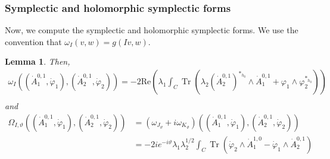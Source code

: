 \documentclass[12pt,letterpaper,reqno]{amsart}
\newtheorem{lem}[thm]{Lemma}
\theoremstyle{remark}
\theoremstyle{definition}
\numberwithin{thm}{section}
\numberwithin{equation}{section}
\numberwithin{figure}{section}
\DeclareMathOperator{\Tr}{Tr}
\begin{document}
\subsubsection{Symplectic and holomorphic symplectic forms}
Now, we compute the symplectic and holomorphic symplectic forms. We use the convention that $\omega_{I}(v,w) = g(Iv,w)$.
\begin{lem}

Then, 
\begin{align*}
\omega_I\left((\dot{A}^{0,1}_1, \dot{\varphi}_1), (\dot{A}^{0,1}_2, \dot{\varphi}_2)\right)=-2 \mathrm{Re}  \left( \lambda_1 \int_C \Tr  \left( \lambda_2 (\dot{A}^{0,1}_{2} )^{*_{h_0}} \wedge \dot{A}^{0,1}_{1}   +\varphi_{1} \wedge \varphi_{2}^{*_{h_0}}  \right) \right)\\\end{align*}
and 
\begin{align*}
\Omega_{I, \vartheta}\left((\dot{A}^{0,1}_1, \dot{\varphi}_1), (\dot{A}^{0,1}_2, \dot{\varphi}_2)\right)&= (\omega_{J_\vartheta} + i \omega_{K_\vartheta})\left((\dot{A}^{0,1}_1, \dot{\varphi}_1), (\dot{A}^{0,1}_2, \dot{\varphi}_2)\right)\\
&=-2i e^{-i \vartheta}   \lambda_1 \lambda_2^{1/2} \int_C  \Tr  \left(\dot{\varphi}_2  \wedge \dot{A}_{1}^{1,0}  - \dot{\varphi}_1 \wedge \dot{A}^{0,1}_{2}  \right) 
\end{align*}
\end{lem}
\end{document}
